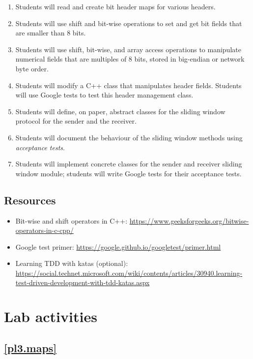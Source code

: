 \documentclass[12pt]{book}
\begin{document}
\begin{enumerate}[label=Objective \arabic*]
  \item\label{pl3.maps} Students will read and create bit header maps for various headers. 
\item\label{pl3.bit} Students will use shift and bit-wise operations to set and get bit fields that are smaller than 8 bits.
\item\label{pl3.byte} Students will use shift, bit-wise, and array access operations to manipulate numerical fields that are multiples of 8 bits, stored in big-endian or network byte order.
\item\label{pl3.head} Students will modify a C++ class that manipulates header fields. Students will use Google tests to test this header management class.
\item\label{pl3.abs} Students will define, on paper, abstract classes for the sliding window protocol for the sender and the receiver.
\item\label{pl3.test} Students will document the behaviour of the sliding window methods using \emph{acceptance tests}.
  \item\label{pl3.impl} Students will implement concrete classes for the sender and receiver sliding window module; students will write Google tests for their acceptance tests.
\end{enumerate}

\subsection{Resources}

\begin{itemize}[label=--]
\item Bit-wise and shift operators in C++: \url{https://www.geeksforgeeks.org/bitwise-operators-in-c-cpp/}
\item Google test primer: \url{https://google.github.io/googletest/primer.html}
\item Learning TDD with katas (optional): \url{https://social.technet.microsoft.com/wiki/contents/articles/30940.learning-test-driven-development-with-tdd-katas.aspx}
\end{itemize}


\section{Lab activities}

\subsection{\ref{pl3.maps}}
\end{document}
